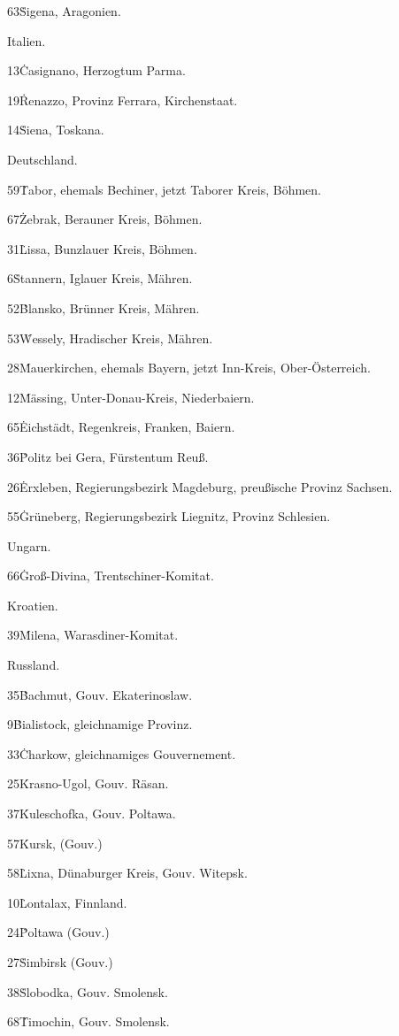 \documentclass[a4paper, 11pt, oneside, polutonikogreek, german]{article}
\begin{document}
63\. Sigena, Aragonien.

Italien.

13\. Casignano, Herzogtum Parma.

19\. Renazzo, Provinz Ferrara, Kirchenstaat.

14\. Siena, Toskana.

Deutschland.

59\. Tabor, ehemals Bechiner, jetzt Taborer Kreis, Böhmen.

67\. Zebrak, Berauner Kreis, Böhmen.

31\. Lissa, Bunzlauer Kreis, Böhmen.

6\. Stannern, Iglauer Kreis, Mähren.

52\. Blansko, Brünner Kreis, Mähren.

53\. Wessely, Hradischer Kreis, Mähren.

28\. Mauerkirchen, ehemals Bayern, jetzt Inn-Kreis, Ober-Österreich.

12\. Mässing, Unter-Donau-Kreis, Niederbaiern.

65\. Eichstädt, Regenkreis, Franken, Baiern.

36\. Politz bei Gera, Fürstentum Reuß.

26\. Erxleben, Regierungsbezirk Magdeburg, preußische Provinz Sachsen.

55\. Grüneberg, Regierungsbezirk Liegnitz, Provinz Schlesien.

Ungarn.

66\. Groß-Divina, Trentschiner-Komitat.

Kroatien.

39\. Milena, Warasdiner-Komitat.

Russland.

35\. Bachmut, Gouv. Ekaterinoslaw.

9\. Bialistock, gleichnamige Provinz.

33\. Charkow, gleichnamiges Gouvernement.

25\. Krasno-Ugol, Gouv. Räsan.

37\. Kuleschofka, Gouv. Poltawa.

57\. Kursk, (Gouv.)

58\. Lixna, Dünaburger Kreis, Gouv. Witepsk.

10\. Lontalax, Finnland.

24\. Poltawa (Gouv.)

27\. Simbirsk (Gouv.)

38\. Slobodka, Gouv. Smolensk.

68\. Timochin, Gouv. Smolensk.
\end{document}
